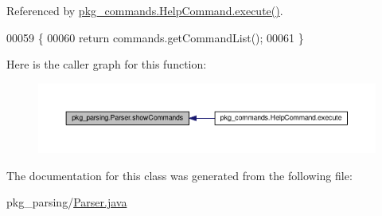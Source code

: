 Referenced by \hyperlink{HelpCommand_8java_source_l00033}{pkg\-\_\-commands.\-Help\-Command.\-execute()}.


\begin{DoxyCode}
00059                                         \{
00060         \textcolor{keywordflow}{return} commands.getCommandList();
00061     \}
\end{DoxyCode}


Here is the caller graph for this function\-:\nopagebreak
\begin{figure}[H]
\begin{center}
\leavevmode
\includegraphics[width=350pt]{classpkg__parsing_1_1Parser_a31545cdbdb409aaeb727289c0ea7be1b_icgraph}
\end{center}
\end{figure}




The documentation for this class was generated from the following file\-:\begin{DoxyCompactItemize}
\item 
pkg\-\_\-parsing/\hyperlink{Parser_8java}{Parser.\-java}\end{DoxyCompactItemize}

